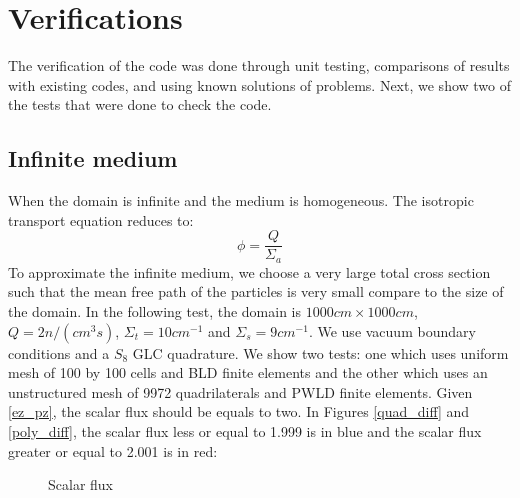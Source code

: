 \section{Verifications}
The verification of the code was done through unit testing, comparisons of
results with existing codes, and using known solutions of problems. Next, we
show two of the tests that were done to check the code.
\subsection{Infinite medium}
When the domain is infinite and the medium is homogeneous. The isotropic
transport equation reduces to:
\begin{equation}
  \phi = \frac{Q}{\Sigma_a}
  \label{ez_pz}
\end{equation}
To approximate the infinite medium, we choose a very large total cross section
such that the mean free path of the particles is very small compare to the
size of the domain. In the following test, the domain is $1000cm \times
1000cm$, $Q = 2 n/(cm^3s)$, $\Sigma_t = 10 cm^{-1}$ and $\Sigma_s = 9
cm^{-1}$. We use vacuum boundary conditions and a $S_{8}$ GLC quadrature.
We show two tests: one which uses uniform mesh of 100 by 100 cells and BLD
finite elements and the other which uses an unstructured mesh of 9972
quadrilaterals and PWLD finite elements. Given \cref{ez_pz}, the scalar flux
should be equals to two. In Figures \ref{quad_diff} and \ref{poly_diff}, the 
scalar flux less or equal to 1.999 is in blue and the scalar flux greater or 
equal to 2.001 is in red:
\begin{figure}[H]
  \centering
  \caption{Scalar flux}
\end{figure}
